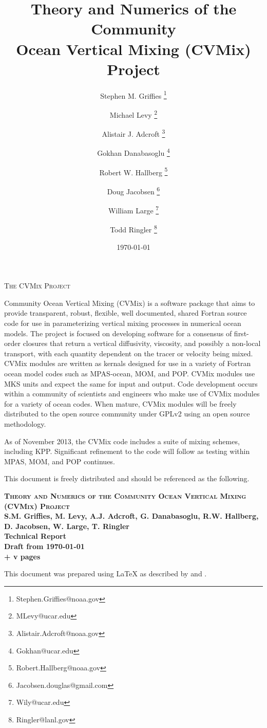 \documentclass[10pt]{book}
\title{\sc Theory and Numerics of the Community 
         \\ Ocean Vertical Mixing (CVMix) Project}
\date{\today}
\author[$\star$]{Stephen M. Grif\/f\/ies \thanks{Stephen.Griffies@noaa.gov}}
\affil[$\star$]{NOAA/Geophysical Fluid Dynamics Laboratory, Princeton USA}
\author[$\dagger$]{Michael Levy \thanks{MLevy@ucar.edu}}
\affil[$\dagger$]{National Center for Atmospheric Research, Boulder USA}
\author[$\star$]{Alistair J. Adcroft \thanks{Alistair.Adcroft@noaa.gov}}
\author[$\dagger$]{Gokhan Danabasoglu \thanks{Gokhan@ucar.edu}}
\author[$\star$]{Robert W. Hallberg \thanks{Robert.Hallberg@noaa.gov}}
\author[$\triangle$]{Doug Jacobsen \thanks{Jacobsen.douglas@gmail.com}}
\affil[$\triangle$]{Los Alamos National Laboratory, Los Alamos USA}
\author[$\dagger$]{William Large \thanks{Wily@ucar.edu}}
\author[$\triangle$]{Todd Ringler \thanks{Ringler@lanl.gov}}
\begin{document}
\maketitle 
\thispagestyle{empty}

\begin{center}
{\scshape \Large The CVMix Project} 
\end{center}

{\sc Community Ocean Vertical Mixing (CVMix)} is a software package
that aims to provide transparent, robust, flexible, well documented,
shared Fortran source code for use in parameterizing vertical mixing
processes in numerical ocean models.  The project is focused on
developing software for a consensus of first-order closures that
return a vertical diffusivity, viscosity, and possibly a non-local
transport, with each quantity dependent on the tracer or velocity
being mixed.  CVMix modules are written as kernals designed for use in
a variety of Fortran ocean model codes such as MPAS-ocean, MOM, and
POP.  CVMix modules use MKS units and expect the same for input and
output.  Code development occurs within a community of scientists and
engineers who make use of CVMix modules for a variety of ocean codes.
When mature, CVMix modules will be freely distributed to the open
source community under GPLv2 using an open source methodology.

As of November 2013, the CVMix code includes a suite of mixing
schemes, including KPP. Significant refinement to the code will follow
as testing within MPAS, MOM, and POP continues.


\vspace{2cm}

\noindent
This document is freely distributed and should be referenced as the
following. \vspace{.25cm}

\noindent
{\bf 
{\scshape{Theory and Numerics of the Community Ocean Vertical
    Mixing (CVMix) Project}}
\\
S.M. Grif\/f\/ies, M. Levy, A.J. Adcroft, G. Danabasoglu,
R.W. Hallberg,  D. Jacobsen, W. Large, T. Ringler
\\
Technical Report
\\
Draft from \today 
\\
\pageref{LastPage} + v pages\\
}
\vspace{.4cm}



\noindent
This document was prepared using \LaTeX \hspace{.1cm} as described by
\cite{Latex} and \cite{LatexCompanion}.
\end{document}
